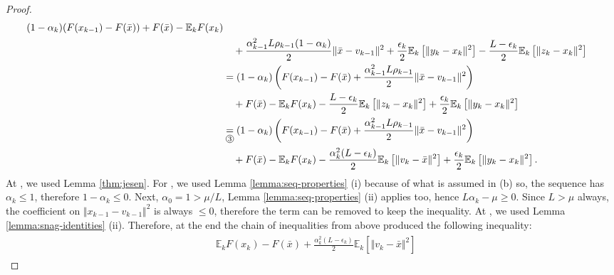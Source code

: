 \documentclass[12pt]{article}
\newcommand{\expect}{\ensuremath{\mathbb E}}
\begin{document}
\begin{proof}
{\begin{align*}
                (1 - \alpha_k)(F(x_{k - 1}) - F(\bar x)) + F(\bar x) - \expect_kF(x_k)
                \\&\quad 
                    + \frac{\alpha_{k - 1}^2L \rho_{k - 1}(1 - \alpha_k)}{2}\Vert \bar x - v_{k - 1}\Vert^2
                    + \frac{\epsilon_k}{2}\expect_k \left[\Vert y_k - x_k \Vert^2\right] 
                    - \frac{L - \epsilon_k}{2}\expect_k \left[\Vert z_k - x_k\Vert^2\right]
                \\&= 
                (1 - \alpha_k)\left(
                    F(x_{k - 1}) - F(\bar x)
                    + \frac{\alpha_{k - 1}^2L\rho_{k - 1}}{2}\Vert \bar x - v_{k - 1}\Vert^2
                \right)
                    \\ &\quad 
                    + F(\bar x) - \expect_kF(x_k) 
                    - \frac{L - \epsilon_k}{2}\expect_k \left[\Vert z_k - x_k\Vert^2\right]
                    + \frac{\epsilon_k}{2}\expect_k \left[\Vert y_k - x_k \Vert^2\right] 
                \\
                &\underset{\circled{3}}{=} 
                (1 - \alpha_k)\left(
                    F(x_{k - 1}) - F(\bar x)
                    + \frac{\alpha_{k - 1}^2L\rho_{k - 1}}{2}\Vert \bar x - v_{k - 1}\Vert^2
                \right)
                    \\ &\quad 
                    + F(\bar x) - \expect_kF(x_k) 
                    - \frac{\alpha_k^2(L - \epsilon_k)}{2}\expect_k \left[\Vert v_k - \bar x\Vert^2\right]
                    + \frac{\epsilon_k}{2}\expect_k \left[\Vert y_k - x_k \Vert^2\right]. 
            \end{align*}
            }
            At , we used Lemma \ref{thm:jesen}. 
            For , we used Lemma \ref{lemma:seq-properties} (i) because of what is assumed in (b) so, the sequence has $\alpha_k \le 1$, therefore $1 - \alpha_k \le 0$. 
            Next, $\alpha_0 = 1 > \mu/L$, Lemma \ref{lemma:seq-properties} (ii) applies too, hence $L\alpha_k - \mu \ge 0$. 
            Since $L > \mu$ always, the coefficient on $\Vert x_{k - 1} - v_{k - 1}\Vert^2$ is always $\le 0$, therefore the term can be removed to keep the inequality. 
            At , we used Lemma \ref{lemma:snag-identities} (ii). 
            Therefore, at the end the chain of inequalities from above produced the following inequality: 
            \begin{align}\begin{split}
                & \expect_kF(x_k) - F(\bar x) 
                + \frac{\alpha_k^2(L - \epsilon_k)}{2}\expect_k \left[\Vert v_k - \bar x\Vert^2\right]

\end{split}
\end{align}
\end{proof}
\end{document}
